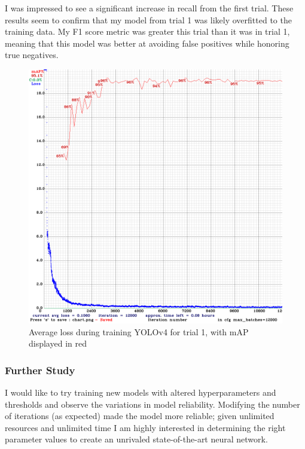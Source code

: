 \documentclass{article}
\begin{document}
            I was impressed to see a significant increase in recall from the first trial. These results seem to confirm that my model from trial 1 was likely overfitted to the training data. My F1 score metric was greater this trial than it was in trial 1, meaning that this model was better at avoiding false positives while honoring true negatives. 
            
            \begin{figure}[h!]
                \centering
                \includegraphics[scale=0.4]{gtsdb_trial2}
                \caption{Average loss during training YOLOv4 for trial 1, with mAP displayed in red}
            \end{figure}
            
            \subsubsection{Further Study}
            
            I would like to try training new models with altered hyperparameters and thresholds and observe the variations in model reliability. Modifying the number of iterations (as expected) made the model more reliable; given unlimited resources and unlimited time I am highly interested in determining the right parameter values to create an unrivaled state-of-the-art neural network. 
            
\end{document}
